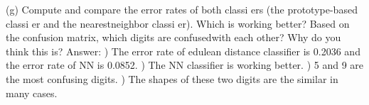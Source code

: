\documentclass[paper=a4, fontsize=11pt]{scrartcl} %
\numberwithin{equation}{section} %
\numberwithin{figure}{section} %
\numberwithin{table}{section} %
\begin{document}
\newline
\newline
(g) Compute and compare the error rates of both classi ers (the prototype-based classi er and the nearestneighbor classi er). Which is working better? Based on the confusion matrix, which digits are confusedwith each other? Why do you think this is?
\newline
Answer:
) The error rate of edulean distance classifier is 0.2036 and the error rate of NN is 0.0852. 
) The NN classifier is working better.
) 5 and 9 are the most confusing digits.
) The shapes of these two digits are the similar in many cases.
\end{document}
